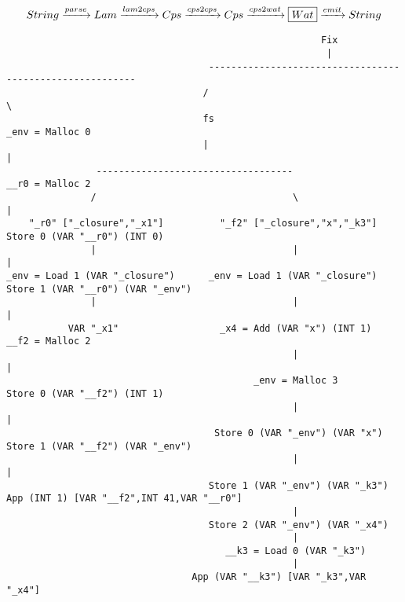 \begin{landscape}
\begin{gather*}
  String \xrightarrow{parse} Lam \xrightarrow{lam2cps} Cps \xrightarrow{cps2cps} Cps \xrightarrow{cps2wat} \boxed{Wat} \xrightarrow{emit} String
\end{gather*}

\begin{lstlisting}
                                                        Fix
                                                         |
                                    ---------------------------------------------------------
                                   /                                                         \
                                   fs                                                 _env = Malloc 0
                                   |                                                         |
                -----------------------------------                                   __r0 = Malloc 2
               /                                   \                                         |
    "_r0" ["_closure","_x1"]          "_f2" ["_closure","x","_k3"]              Store 0 (VAR "__r0") (INT 0)
               |                                   |                                         |
_env = Load 1 (VAR "_closure")      _env = Load 1 (VAR "_closure")           Store 1 (VAR "__r0") (VAR "_env")
               |                                   |                                         |
           VAR "_x1"                  _x4 = Add (VAR "x") (INT 1)                     __f2 = Malloc 2
                                                   |                                         |
                                            _env = Malloc 3                     Store 0 (VAR "__f2") (INT 1)
                                                   |                                         |
                                     Store 0 (VAR "_env") (VAR "x")          Store 1 (VAR "__f2") (VAR "_env")
                                                   |                                         |
                                    Store 1 (VAR "_env") (VAR "_k3")     App (INT 1) [VAR "__f2",INT 41,VAR "__r0"]
                                                   |
                                    Store 2 (VAR "_env") (VAR "_x4")
                                                   |
                                       __k3 = Load 0 (VAR "_k3")
                                                   |
                                 App (VAR "__k3") [VAR "_k3",VAR "_x4"]

\end{lstlisting}
\end{landscape}
\clearpage

